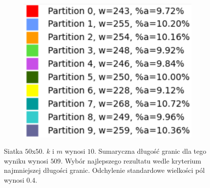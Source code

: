 \begin{figure}[h]
\begin{subfigure}{.33\textwidth}
\end{subfigure}
\begin{subfigure}{.33\textwidth}
    \centering
    \includegraphics[width=0.9\linewidth]{images/results/m/3/results}
    \caption[short]{}
\end{subfigure}
\caption{Siatka $50$x$50$. $k$ i $m$ wynosi $10$.
Sumaryczna długość granic dla tego wyniku wynosi $509$.
Wybór najlepszego rezultatu wedle kryterium najmniejszej długości granic.
Odchylenie standardowe wielkości pól wynosi $0.4$.}
\label{result:m:3}
\end{figure}
